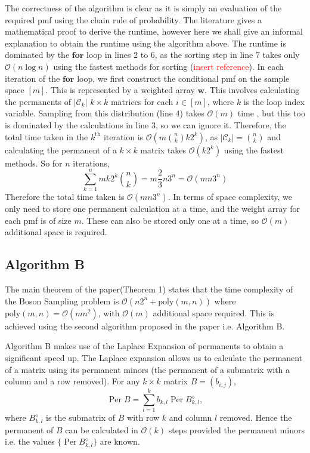 \documentclass[11pt]{article}
\theoremstyle{theorem}
\theoremstyle{remark}
\theoremstyle{plain}
\theoremstyle{definition}
\DeclareMathOperator*{\Per}{\mathrm{Per}}
\begin{document}
The correctness of the algorithm is clear as it is simply an evaluation of the required pmf using the chain rule of probability. The literature gives a mathematical proof to derive the runtime, however here we shall give an informal explanation to obtain the runtime using the algorithm above. The runtime is dominated by the $\textbf{for}$ loop in lines 2 to 6, as the sorting step in line 7 takes only $\mathcal{O}(n \log n)$ using the fastest methods for sorting (\textcolor{red}{insert reference}). In each iteration of the $\textbf{for}$ loop, we first construct the conditional pmf on the sample space $[m]$. This is represented by a weighted array $\textbf{w}$. This involves calculating the permanents of $\left|\mathcal{C}_k\right|$ $k \times k$ matrices for each $i \in [m]$, where $k$ is the loop index variable. Sampling from this distribution (line 4) takes $\mathcal{O}(m)$ time \cite{walker1974}, but this too is dominated by the calculations in line 3, so we can ignore it. Therefore, the total time taken in the $k^\text{th}$ iteration is $\mathcal{O}(m \binom{n}{k} k 2^k)$, as $\left|\mathcal{C}_k\right| = \binom{n}{k}$ and calculating the permanent of a $k \times k$ matrix takes $\mathcal{O}(k 2^k)$ using the fastest methods. So for $n$ iterations,
\begin{equation}
\sum_{k=1}^n m k 2^k \binom{n}{k} = m \frac{2}{3} n 3^n = \mathcal{O}(mn3^n)
\end{equation}
Therefore the total time taken is $\mathcal{O}(mn3^n)$. In terms of space complexity, we only need to store one permanent calculation at a time, and the weight array for each pmf is of size $m$. These can also be stored only one at a time, so $\mathcal{O}(m)$ additional space is required.

\subsection{Algorithm B} \label{sec:algB}
The main theorem of the paper(Theorem 1) states that the time complexity of the Boson Sampling problem is $\mathcal{O}(n2^n + \text{poly}(m, n))$ where $ \text{poly}(m, n) = \mathcal{O}(mn^2)$, with $\mathcal{O}(m)$ additional space required. This is achieved using the second algorithm proposed in the paper i.e. Algorithm B.

Algorithm B makes use of the Laplace Expansion \cite{marcus_minc66} of permanents to obtain a significant speed up. The Laplace expansion allows us to calculate the permanent of a matrix using its permanent minors (the permanent of a submatrix with a column and a row removed). For any $k \times k$ matrix $B = (b_{i,j})$,
\begin{equation}
\Per B = \sum_{l=1}^k b_{k, l} \Per B_{k, l}^{\diamond},
\end{equation}
where $B_{k, l}^{\diamond}$  is the submatrix of $B$ with row $k$ and column $l$ removed. Hence the permanent of $B$ can be calculated in $\mathcal{O}(k)$ steps provided the permanent minors i.e. the values $\{ \Per B_{k, l}^{\diamond} \}$ are known.
\end{document}
